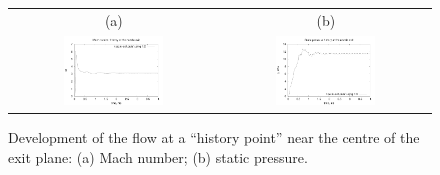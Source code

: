 \begin{figure}[htbp]
\begin{center}
\begin{tabular}{cc}
(a) & (b) \\
\includegraphics[width=0.5\textwidth]{../2D/back-nozzle/back_history_M.pdf} &
\includegraphics[width=0.5\textwidth]{../2D/back-nozzle/back_history_p.pdf}
\end{tabular}
\end{center}
\caption{Development of the flow at a ``history point'' near
         the centre of the exit plane:
         (a) Mach number;
         (b) static pressure.}
\label{back-transient-fig}
\end{figure}

